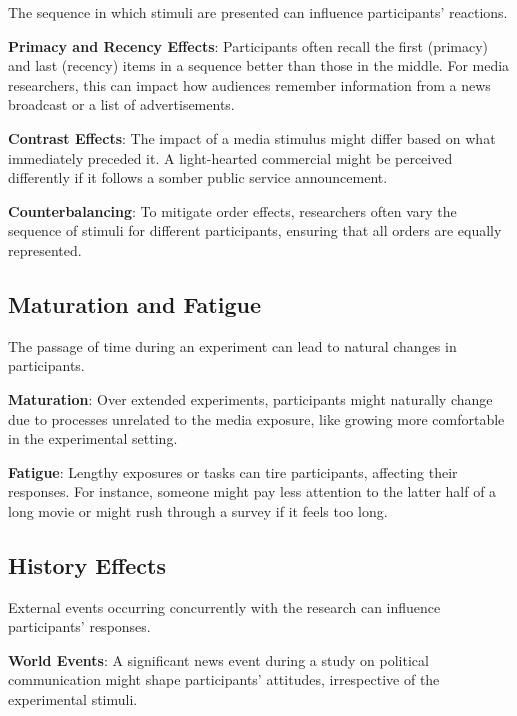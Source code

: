 \documentclass[
  b5paper]{book}
\begin{document}
The sequence in which stimuli are presented can influence participants' reactions.

\textbf{Primacy and Recency Effects}: Participants often recall the first (primacy) and last (recency) items in a sequence better than those in the middle. For media researchers, this can impact how audiences remember information from a news broadcast or a list of advertisements.

\textbf{Contrast Effects}: The impact of a media stimulus might differ based on what immediately preceded it. A light-hearted commercial might be perceived differently if it follows a somber public service announcement.

\textbf{Counterbalancing}: To mitigate order effects, researchers often vary the sequence of stimuli for different participants, ensuring that all orders are equally represented.

\hypertarget{maturation-and-fatigue}{%
\subsection*{Maturation and Fatigue}\label{maturation-and-fatigue}}

The passage of time during an experiment can lead to natural changes in participants.

\textbf{Maturation}: Over extended experiments, participants might naturally change due to processes unrelated to the media exposure, like growing more comfortable in the experimental setting.

\textbf{Fatigue}: Lengthy exposures or tasks can tire participants, affecting their responses. For instance, someone might pay less attention to the latter half of a long movie or might rush through a survey if it feels too long.

\hypertarget{history-effects}{%
\subsection*{History Effects}\label{history-effects}}

External events occurring concurrently with the research can influence participants' responses.

\textbf{World Events}: A significant news event during a study on political communication might shape participants' attitudes, irrespective of the experimental stimuli.
\end{document}
